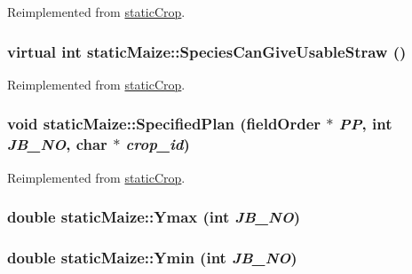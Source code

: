 Reimplemented from \hyperlink{classstatic_crop_ada7c8c797de629277a5ba0b0a4a3c17e}{staticCrop}.\hypertarget{classstatic_maize_a7d5badef27f557d91fe682c764f1b27a}{
\subsubsection[{SpeciesCanGiveUsableStraw}]{\setlength{\rightskip}{0pt plus 5cm}virtual int staticMaize::SpeciesCanGiveUsableStraw ()}}
\label{classstatic_maize_a7d5badef27f557d91fe682c764f1b27a}


Reimplemented from \hyperlink{classstatic_crop_ab7763e4e6a0b9eff1788cb86ebad8170}{staticCrop}.\hypertarget{classstatic_maize_ae29df9ec33e841c6fd482c96f330b41c}{
\subsubsection[{SpecifiedPlan}]{\setlength{\rightskip}{0pt plus 5cm}void staticMaize::SpecifiedPlan ({\bf fieldOrder} $\ast$ {\em PP}, \/  int {\em JB\_\-NO}, \/  char $\ast$ {\em crop\_\-id})}}
\label{classstatic_maize_ae29df9ec33e841c6fd482c96f330b41c}


Reimplemented from \hyperlink{classstatic_crop_af19d8a1e4f4833325f6712c22ede8b45}{staticCrop}.\hypertarget{classstatic_maize_a1f3847a4d1509dc568d21405de42afb5}{
\subsubsection[{Ymax}]{\setlength{\rightskip}{0pt plus 5cm}double staticMaize::Ymax (int {\em JB\_\-NO})}}
\label{classstatic_maize_a1f3847a4d1509dc568d21405de42afb5}
\hypertarget{classstatic_maize_a3eaafefd01df095524580ac1fb026697}{
\subsubsection[{Ymin}]{\setlength{\rightskip}{0pt plus 5cm}double staticMaize::Ymin (int {\em JB\_\-NO})}}
\label{classstatic_maize_a3eaafefd01df095524580ac1fb026697}


